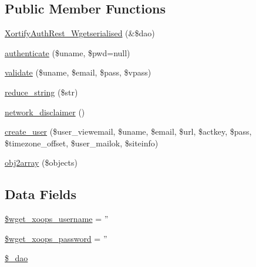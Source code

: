 \subsection*{Public Member Functions}
\begin{DoxyCompactItemize}
\item 
\hyperlink{class_xortify_auth_rest___wgetserialised_ae7a6ecbdc464f48cce1e8edfa7de02d8}{Xortify\-Auth\-Rest\-\_\-\-Wgetserialised} (\&\$dao)
\item 
\hyperlink{class_xortify_auth_rest___wgetserialised_a00678ba307326b734e6c679f28bea315}{authenticate} (\$uname, \$pwd=null)
\item 
\hyperlink{class_xortify_auth_rest___wgetserialised_a91121a1b702dfd20fb65a027c8ed26ec}{validate} (\$uname, \$email, \$pass, \$vpass)
\item 
\hyperlink{class_xortify_auth_rest___wgetserialised_ae463a3baa44e95fa5b5151ab2334df1c}{reduce\-\_\-string} (\$str)
\item 
\hyperlink{class_xortify_auth_rest___wgetserialised_a1874c27b6f81a3f2ff9015405ad0f8bc}{network\-\_\-disclaimer} ()
\item 
\hyperlink{class_xortify_auth_rest___wgetserialised_ac72efc5ad313a592cf6706876f56f7ec}{create\-\_\-user} (\$user\-\_\-viewemail, \$uname, \$email, \$url, \$actkey, \$pass, \$timezone\-\_\-offset, \$user\-\_\-mailok, \$siteinfo)
\item 
\hyperlink{class_xortify_auth_rest___wgetserialised_aabc52e4f78557f0e0b360a8aaba6e11d}{obj2array} (\$objects)
\end{DoxyCompactItemize}
\subsection*{Data Fields}
\begin{DoxyCompactItemize}
\item 
\hyperlink{class_xortify_auth_rest___wgetserialised_a237f5dcc3c161c5b1909327a90b56618}{\$wget\-\_\-xoops\-\_\-username} = ''
\item 
\hyperlink{class_xortify_auth_rest___wgetserialised_ab9145a618042e8282ecb90d5f634311f}{\$wget\-\_\-xoops\-\_\-password} = ''
\item 
\hyperlink{class_xortify_auth_rest___wgetserialised_a12a029c610f699b4b25e79a1f64a3485}{\$\-\_\-dao}
\end{DoxyCompactItemize}


